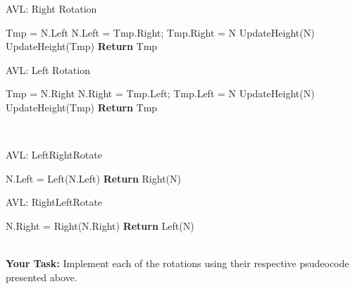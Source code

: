 \documentclass[a4paper]{article}
\begin{document}
\begin{minipage}{0.48\textwidth}
	\begin{algorithm}[H]
		\caption{AVL: Right Rotation}\label{}
		\begin{algorithmic}[1]
			\State Tmp = N.Left
			\State N.Left = Tmp.Right;
			\State Tmp.Right = N
			\State 
			\State UpdateHeight(N)
			\State UpdateHeight(Tmp)
			\State
			\State \textbf{Return} Tmp
			\EndProcedure
		\end{algorithmic}
	\end{algorithm}
\end{minipage}
\hfill
\begin{minipage}{0.48\textwidth}
	\begin{algorithm}[H]
		\caption{AVL: Left Rotation}\label{}
		\begin{algorithmic}[1]
			\State Tmp = N.Right
			\State N.Right = Tmp.Left;
			\State Tmp.Left = N
			\State 
			\State UpdateHeight(N)
			\State UpdateHeight(Tmp)
			\State
			\State \textbf{Return} Tmp
			\EndProcedure
		\end{algorithmic}
	\end{algorithm}
\end{minipage}
\\
\begin{minipage}{0.48\textwidth}
	\begin{algorithm}[H]
		\caption{AVL: LeftRightRotate}\label{}
		\begin{algorithmic}[1]
			\State N.Left = Left(N.Left)
			\State \textbf{Return} Right(N)
			\EndProcedure
		\end{algorithmic}
	\end{algorithm}
\end{minipage}
\hfill
\begin{minipage}{0.48\textwidth}
	\begin{algorithm}[H]
		\caption{AVL: RightLeftRotate}\label{}
		\begin{algorithmic}[1]
			\State N.Right = Right(N.Right)
			\State \textbf{Return} Left(N)
			\EndProcedure
		\end{algorithmic}
	\end{algorithm}
\end{minipage}
\\


\textbf{Your Task:} Implement each of the rotations using their respective psudeocode presented above.
\end{document}
